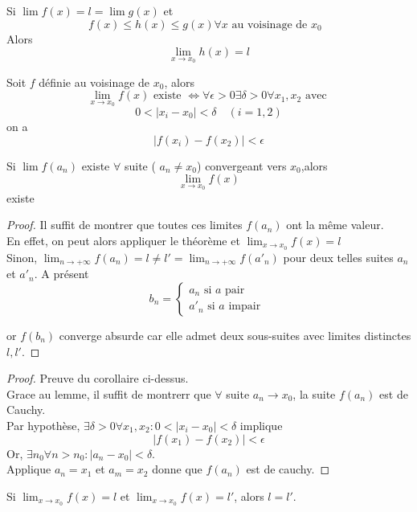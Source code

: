 \documentclass[../main.tex]{subfiles}
\begin{document}
\begin{crly}
	Si $\lim f(x) =l = \lim g(x)$ et 
	\[ 
		f(x) \leq h(x) \leq g(x) \forall x \text{ au voisinage de $x_0$ } 
	\]
	Alors
	\[ 
		\lim_{x \to x_0} h(x) =l
	\]
	
\end{crly}
\begin{crly}[Cauchy]
	Soit $f$ définie au voisinage de $x_0$, alors
	\[ 
	\lim_{x \to x_0} f(x) \text{ existe  } \iff \forall \epsilon>0 \exists \delta >0 \forall x_1,x_2 \text{ avec } 
	\]
	\[ 
		0< |x_i-x_0| < \delta \quad ( i=1,2)
	\]
	on a
	\[ 
		|f(x_i)- f(x_2)| < \epsilon
	\]
	
	
\end{crly}
\begin{lemma}
	Si $\lim f(a_n)$ existe $\forall$ suite ( $a_n \neq x_0$) convergeant vers $x_0$,alors
	\[ 
		\lim_{x \to x_0} f(x)
	\]
	existe
\end{lemma}
\begin{proof}
	Il suffit de montrer que toutes ces limites $f(a_n)$ ont la même valeur.\\
	En effet, on peut alors appliquer le théorème et $\lim_{x \to x_0} f(x) =l$ \\
	Sinon, $ \lim_{n \to  + \infty} f(a_n) = l \neq l' = \lim_{n \to  + \infty} f(a'_n)$ pour deux telles suites $a_n$ et $a'_n$. A présent
	\[ 
	b_n = 
	\begin{cases}
	a_n \text{ si $a$ pair } \\
	a'_n \text{ si $a$ impair } 
	\end{cases}
	\]

	or $f(b_n)$ converge absurde car elle admet deux sous-suites avec limites distinctes $l,l'$.

\end{proof}
\begin{proof}
Preuve du corollaire ci-dessus.\\
Grace au lemme, il suffit de montrerr que $\forall$ suite $a_n \to x_0$, la suite $f(a_n)$ est de Cauchy.\\
Par hypothèse, $\exists \delta>0 \forall x_1,x_2: 0< |x_i-x_0| < \delta$ implique
\[ 
	|f(x_1) -f(x_2)| < \epsilon
\]
Or, $\exists n_0 \forall n>n_0: |a_n -x_0| < \delta $.\\
Applique $a_n=x_1$ et $a_m = x_2$ donne que $f(a_n)$ est de cauchy.
\end{proof}
\begin{crly}
	Si $\lim_{x \to x_0} f(x)=l$ et $\lim_{x \to x_0} f(x) = l'$, alors $l=l'$.
\end{crly}
\end{document}
